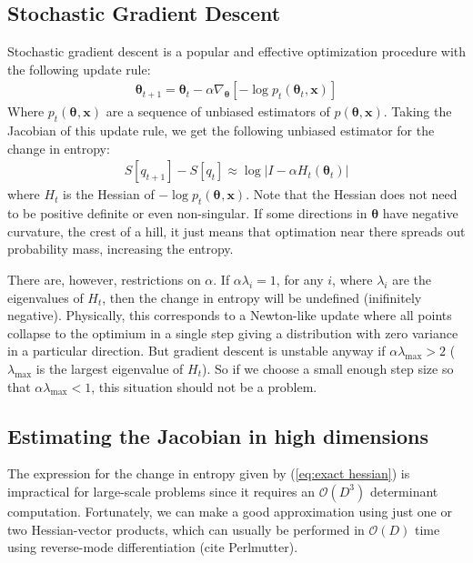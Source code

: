 \documentclass[]{article}
\newcommand{\vx}{\mathbf{x}}
\newcommand{\data}{\vx}
\newcommand{\params}{\mathbf{\theta}}
\newcommand{\stepsize}{\alpha}
\newcommand{\jointdist}{p(\params , \data)}
\newcommand{\subjointdist}[2]{p_{#1}(\params_{#2} , \data)}
\newcommand{\bigo}[1]{\mathcal{O}\left(#1\right)}
\begin{document}
\subsection{Stochastic Gradient Descent}

Stochastic gradient descent is a popular and effective optimization
procedure with the following update rule:
\begin{align}
\params_{t+1} =
  \params_t - \stepsize \nabla_{\params}
  \left[-\log \subjointdist{t}{t} \right] \nonumber
\end{align}
Where $\subjointdist{t}{}$ are a sequence of unbiased estimators of
$\jointdist$. Taking the Jacobian of this update rule, we get the following
unbiased estimator for the change in entropy:
\begin{align}
S[q_{t+1}] - S[q_t] \approx \log \left| I - \stepsize H_t(\params_t)
\right| \label{eq:exact hessian}
\end{align}
where $H_t$ is the Hessian of $-\log\subjointdist{t}{}$. Note that the Hessian does not
need to be positive definite or even non-singular. If some directions in
$\params$ have negative curvature, the crest of a hill, it just means that
optimation near there spreads out probability mass, increasing the entropy.

There are, however, restrictions on $\stepsize$. If $\stepsize\lambda_i = 1$,
for any $i$, where $\lambda_i$ are the eigenvalues of $H_t$, then the change in
entropy will be undefined (inifinitely negative). Physically, this corresponds
to a Newton-like update where all points collapse to the optimium in a single
step giving a distribution with zero variance in a particular direction. But
gradient descent is unstable anyway if $\stepsize\lambda_{\text{max}} > 2$
($\lambda_{\text{max}}$ is the largest eigenvalue of $H_t$). So if we
choose a small enough step size so that $\stepsize\lambda_{\text{max}} < 1$,
this situation should not be a problem.

\subsection{Estimating the Jacobian in high dimensions}

The expression for the change in entropy given by (\ref{eq:exact hessian}) is
impractical for large-scale problems since it requires an $\bigo{D^3}$
determinant computation. Fortunately, we can make a good approximation using
just one or two Hessian-vector products, which can usually be performed in
$\bigo{D}$ time using reverse-mode differentiation (cite Perlmutter).
\end{document}
